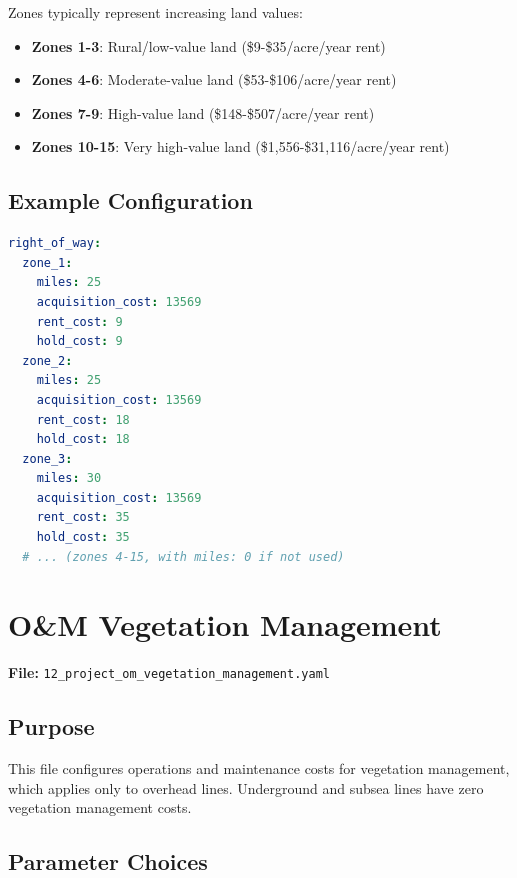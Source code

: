 \documentclass[ctcc_full_documentation.tex]{subfiles}
\begin{document}
Zones typically represent increasing land values:
\begin{itemize}
    \item \textbf{Zones 1-3}: Rural/low-value land (\$9-\$35/acre/year rent)
    \item \textbf{Zones 4-6}: Moderate-value land (\$53-\$106/acre/year rent)
    \item \textbf{Zones 7-9}: High-value land (\$148-\$507/acre/year rent)
    \item \textbf{Zones 10-15}: Very high-value land (\$1,556-\$31,116/acre/year rent)
\end{itemize}

\subsection{Example Configuration}

\begin{lstlisting}[language=yaml]
right_of_way:
  zone_1:
    miles: 25
    acquisition_cost: 13569
    rent_cost: 9
    hold_cost: 9
  zone_2:
    miles: 25
    acquisition_cost: 13569
    rent_cost: 18
    hold_cost: 18
  zone_3:
    miles: 30
    acquisition_cost: 13569
    rent_cost: 35
    hold_cost: 35
  # ... (zones 4-15, with miles: 0 if not used)
\end{lstlisting}

\section{O\&M Vegetation Management}
\label{sec:vegetation}

\textbf{File:} \texttt{12\_project\_om\_vegetation\_management.yaml}

\subsection{Purpose}

This file configures operations and maintenance costs for vegetation management, which applies only to overhead lines. Underground and subsea lines have zero vegetation management costs.

\subsection{Parameter Choices}
\end{document}
